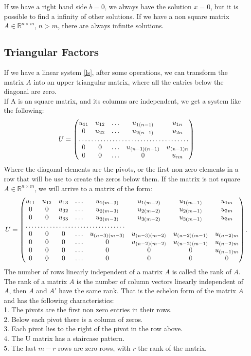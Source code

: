 \documentclass[12pt]{report}
\begin{document}
If we have a right hand side $b=0$, we always have the solution $x=0$, but it is
possible to find a infinity of other solutions. If we have a non square matrix
$A\in \mathbb{R}^{n\times m}$, $n>m$, there are always infinite solutions.
\subsection*{Triangular Factors}
If we have a linear system \eqref{ls}, after some operations, we can transform the
matrix $A$ into an upper triangular matrix, where all the entries below the 
diagonal are zero.\\
If A is an square matrix, and its columns are independent, we get a system like the 
following:
\begin{equation*}
U=
\begin{pmatrix}
u_{11} & u_{12} & \dots &u_{1(n-1)}& u_{1n}\\
0 & u_{22} & \dots &u_{2(n-1)} &u_{2n}\\
\hdotsfor{5}\\
0 & 0 & \dots &u_{(n-1)(n-1)}& u_{(n-1)n}\\
0 & 0& \dots&0 &u_{nn}
\end{pmatrix}
\end{equation*}
Where the diagonal elements are the pivots, or the first non zero elements in a row
that will be use to create the zeros below them.
If the matrix is not square $A\in\mathbb{R}^{n\times m}$, we will arrive to a matrix of the form:
\begin{equation*}
U=
\begin{pmatrix}
u_{11} & u_{12} & u_{13}&\dots&u_{1(m-3)} &u_{1(m-2)}&u_{1(m-1)}& u_{1m}\\
0 & 0 & u_{32}&\dots&u_{2(m-3)} &u_{2(m-2)}&u_{2(m-1)} &u_{2m}\\
0 & 0 &u_{33} &\dots&u_{3(m-3)} &u_{3(m-2)}&u_{3(m-1)} &u_{3m}\\
\hdotsfor{5}\\
0 & 0 & 0&\dots&u_{(n-3)(m-3)}&u_{(n-3)(m-2)} &u_{(n-2)(m-1)}  &u_{(n-2)m}\\
0 & 0 & 0&\dots&0&u_{(n-2)(m-2)} & u_{(n-2)(m-1)} &u_{(n-2)m}\\
0 & 0 & 0&\dots&0 &0&0& u_{(n-1)m}\\
0 & 0& 0&\dots&0&0 &0&0
\end{pmatrix}.
\end{equation*}
The number of rows linearly independent of a matrix $A$ is called the rank of $A$.
The rank of a matrix $A$ is the number of column vectors linearly independent of $A$,
then $A$ and $A'$ have the same rank.
That is the echelon form of the matrix $A$ and has the following characteristics:\\
1. The pivots are the first non zero entries in their rows.\\
2. Below each pivot there is a column of zeros.\\
3. Each pivot lies to the right of the pivot in the row above. \\
4. The U matrix has a staircase pattern.\\
5. The last $m-r$ rows are zero rows, with $r$ the rank of the matrix. 
\end{document}
